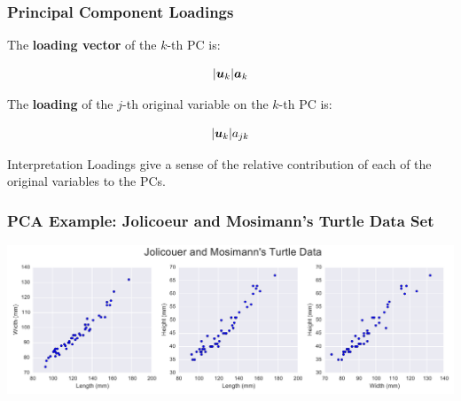 \documentclass{beamer}
\begin{document}
\begin{frame}
  \frametitle{Principal Component Loadings}

The \textbf{loading vector} of the $k$-th PC is:

\[
|\bm{u}_k|\bm{a}_k
\]

The \textbf{loading} of the $j$-th original variable on the $k$-th PC is:

\[
|\bm{u}_k|a_{jk}
\]

\begin{block}{Interpretation}
Loadings give a sense of the relative contribution of each of the original variables to the PCs.
\end{block}

\end{frame}

\begin{frame}[fragile]
  \frametitle{PCA Example: Jolicoeur and Mosimann's Turtle Data Set}

\begin{center}
\hspace*{-0.8cm}
\includegraphics[width=0.95\paperwidth]{turtles}
\end{center}
\end{frame}

\end{document}
